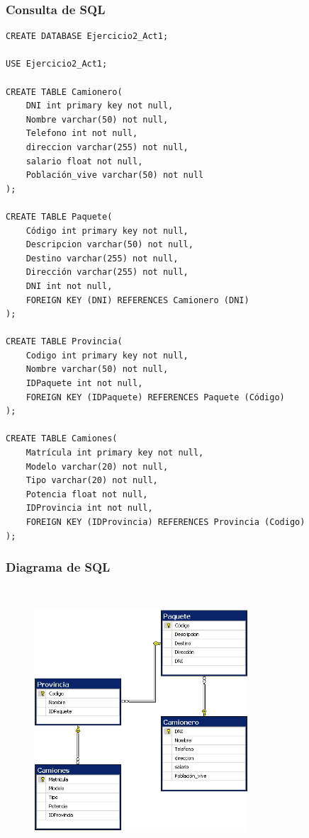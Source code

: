 \documentclass[a4paper, 12pt]{article}
\begin{document}
\begin{justify}
        \subsubsection{Consulta de SQL}
\begin{verbatim}
CREATE DATABASE Ejercicio2_Act1;

USE Ejercicio2_Act1;

CREATE TABLE Camionero(
    DNI int primary key not null,
    Nombre varchar(50) not null,
    Telefono int not null,
    direccion varchar(255) not null,
    salario float not null,
    Población_vive varchar(50) not null
);

CREATE TABLE Paquete(
    Código int primary key not null,
    Descripcion varchar(50) not null,
    Destino varchar(255) not null,
    Dirección varchar(255) not null,
    DNI int not null,
    FOREIGN KEY (DNI) REFERENCES Camionero (DNI)
);

CREATE TABLE Provincia(
    Codigo int primary key not null,
    Nombre varchar(50) not null,
    IDPaquete int not null,
    FOREIGN KEY (IDPaquete) REFERENCES Paquete (Código)
);

CREATE TABLE Camiones(
    Matrícula int primary key not null,
    Modelo varchar(20) not null,
    Tipo varchar(20) not null,
    Potencia float not null,
    IDProvincia int not null,
    FOREIGN KEY (IDProvincia) REFERENCES Provincia (Codigo)
);
\end{verbatim}
        \subsubsection{Diagrama de SQL}
        \begin{figure}[H]
            \centering
            \includegraphics[width=8cm,height=10cm]{sql2.png}
        \end{figure}

\end{justify}
\end{document}
